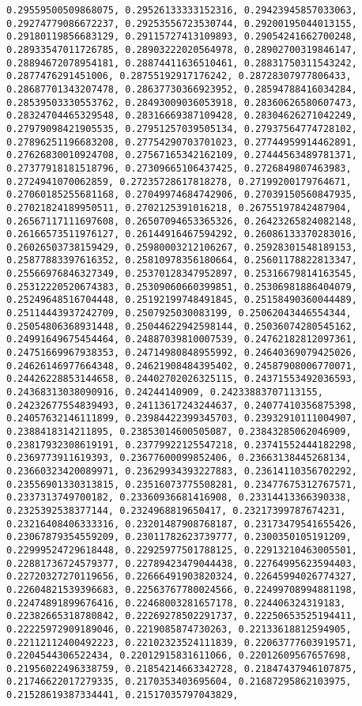 \documentclass[11pt]{article}
\begin{document}
\begin{Verbatim}[commandchars=\\\{\}]
0.29559500509868075, 0.29526133333152316, 0.29423945857033063, 0.29274779086672237, 0.29253556723530744, 0.29200195044013155, 0.29180119856683129, 0.29115727413109893, 0.29054241662700248, 0.28933547011726785, 0.28903222020564978, 0.28902700319846147, 0.28894672078954181, 0.28874411636510461, 0.28831750311543242, 0.2877476291451006, 0.28755192917176242, 0.28728307977806433, 0.28687701343207478, 0.28637730366923952, 0.28594788416034284, 0.28539503330553762, 0.28493009036053918, 0.28360626580607473, 0.28324704465329548, 0.28316669387109428, 0.28304626271042249, 0.27979098421905535, 0.27951257039505134, 0.27937564774728102, 0.27896251196683208, 0.27754290703701023, 0.27744959914462891, 0.27626830010924708, 0.27567165342162109, 0.27444563489781371, 0.27377918181518796, 0.27309665106437425, 0.2726849807463983, 0.2724941070062859, 0.27235728617818278, 0.27199200179764671, 0.27060185255681168, 0.27049974684742906, 0.27039150560847935, 0.27021824189950511, 0.2702125391016218, 0.26755197842487904, 0.26567117111697608, 0.26507094653365326, 0.26423265824082148, 0.26166573511976127, 0.26144916467594292, 0.26086133370283016, 0.26026503738159429, 0.25980003212106267, 0.25928301548189153, 0.25877883397616352, 0.25810978356180664, 0.25601178822813347, 0.25566976846327349, 0.25370128347952897, 0.25316679814163545, 0.25312220520674383, 0.25309060660399851, 0.25306981886404079, 0.25249648516704448, 0.25192199748491845, 0.25158490360044489, 0.25114443937242709, 0.2507925030083199, 0.25062043446554344, 0.25054806368931448, 0.25044622942598144, 0.25036074280545162, 0.24991649675454464, 0.24887039810007539, 0.24762182812097361, 0.24751669967938353, 0.24714980848955992, 0.24640369079425026, 0.24626146977664348, 0.24621908484395402, 0.24587908006770071, 0.24426228853144658, 0.24402702026325115, 0.24371553492036593, 0.24368313038090916, 0.24244140909, 0.24233883707113155, 0.24232677554839493, 0.24113617243244637, 0.24077410356875398, 0.24057632146111899, 0.23984422399345703, 0.23932910111004907, 0.2388418314211895, 0.23853014600505087, 0.23843285062046909, 0.23817932308619191, 0.23779922125547218, 0.23741552444182298, 0.2369773911619393, 0.23677600099852406, 0.23663138445268134, 0.23660323420089971, 0.23629934393227883, 0.23614110356702292, 0.23556901330313815, 0.23516073775508281, 0.23477675312767571, 0.2337313749700182, 0.23360936681416908, 0.23314413366390338, 0.2325392538377144, 0.2324968819650417, 0.23217399787674231, 0.23216408406333316, 0.23201487908768187, 0.23173479541655426, 0.23067879354559209, 0.23011782623739777, 0.2300350105191209, 0.22999524729618448, 0.22925977501788125, 0.22913210463005501, 0.22881736724579377, 0.22789423479044438, 0.22764995623594403, 0.22720327270119656, 0.22666491903820324, 0.22645994026774327, 0.22604821539396683, 0.22563767780024566, 0.22499708994881198, 0.22474891899676416, 0.22468003281657178, 0.224406324319183, 0.22382665318780842, 0.22269278502291737, 0.22250653525194411, 0.22225972909189046, 0.2219085874730263, 0.22133618812594905, 0.22112112400492223, 0.22102323524111839, 0.22063777603919571, 0.2204544306522434, 0.22012915831611066, 0.22012609567657698, 0.21956022496338759, 0.21854214663342728, 0.21847437946107875, 0.21746622017279335, 0.2170353403695604, 0.21687295862103975, 0.21528619387334441, 0.21517035797043829, 
\end{Verbatim}
\end{document}
